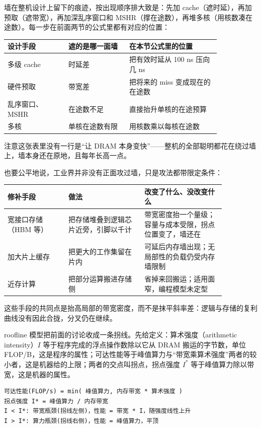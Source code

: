 墙在整机设计上留下的痕迹，按出现顺序排大致是：先加 cache（遮时延），再加预取（遮带宽），再加深乱序窗口和 MSHR（撑在途数），再堆多核（用核数凑在途数）。每一步在前面两节的公式里都有对应的位置：

\begin{longtable}{L{0.24\linewidth}L{0.24\linewidth}L{0.36\linewidth}}
\toprule
设计手段 & 遮的是哪一面墙 & 在本节公式里的位置 \\
\midrule
多级 cache & 时延差 & 把有效时延从 100 ns 压向几 ns \\\tablerowrule
硬件预取 & 带宽差 & 把将来的 miss 变成现在的在途数 \\\tablerowrule
乱序窗口、MSHR & 在途数不足 & 直接抬升单核的在途预算 \\\tablerowrule
多核 & 单核在途数有限 & 用核数乘以每核在途数 \\
\bottomrule
\end{longtable}

注意这张表里没有一行是“让 DRAM 本身变快”——整机的全部聪明都花在绕过墙上，墙本身还在原地，且每年长高一点。

也要公平地说，工业界并非没有正面攻过墙，只是攻法都带限定条件：

\begin{longtable}{L{0.24\linewidth}L{0.30\linewidth}L{0.32\linewidth}}
\toprule
修补手段 & 做法 & 改变了什么、没改变什么 \\
\midrule
宽接口存储（HBM 等） & 把存储堆叠到逻辑芯片近旁，引脚以千计 & 带宽密度抬一个量级；容量与成本受限，拐点位置变了，墙还在 \\\tablerowrule
加大片上缓存 & 把更大的工作集留在片内 & 可延后内存墙出现；无局部性的负载仍受内存墙限制 \\\tablerowrule
近存计算 & 把部分运算搬进存储侧 & 省掉来回搬运；适用面窄，编程模型未定型 \\
\bottomrule
\end{longtable}

这些手段的共同点是抬高局部的带宽密度，而不是抹平斜率差：逻辑与存储的复利曲线没有因此合拢，分叉仍在继续。

roofline 模型把前面的讨论收成一条拐线。先给定义：算术强度（arithmetic intensity）$I$ 等于程序完成的浮点操作数除以它从 DRAM 搬运的字节数，单位 FLOP/B，这是程序的属性；可达性能等于峰值算力与“带宽乘算术强度”两者的较小者，这是机器给的上限；两者的交点叫拐点，拐点强度 $I^{*}$ 等于峰值算力除以带宽，这是机器的属性。

\begin{lstlisting}
可达性能(FLOP/s) = min( 峰值算力, 内存带宽 * 算术强度 )
拐点强度 I* = 峰值算力 / 内存带宽
I < I*: 带宽瓶颈(拐线左侧)，性能 = 带宽 * I，随强度线性上升
I > I*: 算力瓶颈(拐线右侧)，性能 = 峰值算力，平顶
\end{lstlisting}


